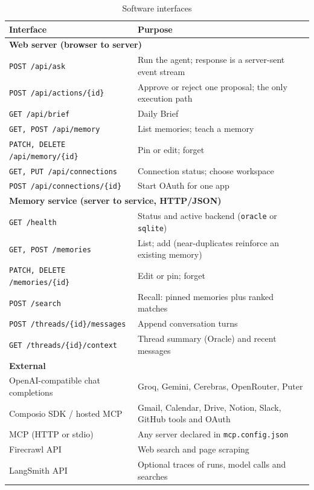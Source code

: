 \documentclass[oneside,a4paper,12pt]{report}
\begin{document}
\begin{table}[!htbp]
\begin{center}
\def\arraystretch{1.25}
\small
\begin{tabularx}{\textwidth}{| p{5.2cm} | X |}
\hline
Interface & Purpose \\ \hline
\multicolumn{2}{|l|}{\textbf{Web server (browser to server)}} \\ \hline
\texttt{POST /api/ask} & Run the agent; response is a server-sent event stream \\ \hline
\texttt{POST /api/actions/\{id\}} & Approve or reject one proposal; the only execution path \\ \hline
\texttt{GET /api/brief} & Daily Brief \\ \hline
\texttt{GET, POST /api/memory} & List memories; teach a memory \\ \hline
\texttt{PATCH, DELETE /api/memory/\{id\}} & Pin or edit; forget \\ \hline
\texttt{GET, PUT /api/connections} & Connection status; choose workspace \\ \hline
\texttt{POST /api/connections/\{id\}} & Start OAuth for one app \\ \hline
\multicolumn{2}{|l|}{\textbf{Memory service (server to service, HTTP/JSON)}} \\ \hline
\texttt{GET /health} & Status and active backend (\texttt{oracle} or \texttt{sqlite}) \\ \hline
\texttt{GET, POST /memories} & List; add (near-duplicates reinforce an existing memory) \\ \hline
\texttt{PATCH, DELETE /memories/\{id\}} & Edit or pin; forget \\ \hline
\texttt{POST /search} & Recall: pinned memories plus ranked matches \\ \hline
\texttt{POST /threads/\{id\}/messages} & Append conversation turns \\ \hline
\texttt{GET /threads/\{id\}/context} & Thread summary (Oracle) and recent messages \\ \hline
\multicolumn{2}{|l|}{\textbf{External}} \\ \hline
OpenAI-compatible chat completions & Groq, Gemini, Cerebras, OpenRouter, Puter \\ \hline
Composio SDK / hosted MCP & Gmail, Calendar, Drive, Notion, Slack, GitHub tools and OAuth \\ \hline
MCP (HTTP or stdio) & Any server declared in \texttt{mcp.config.json} \\ \hline
Firecrawl API & Web search and page scraping \\ \hline
LangSmith API & Optional traces of runs, model calls and searches \\ \hline
\end{tabularx}
\end{center}
\caption{Software interfaces}
\label{tab:interfaces}
\end{table}
\end{document}
